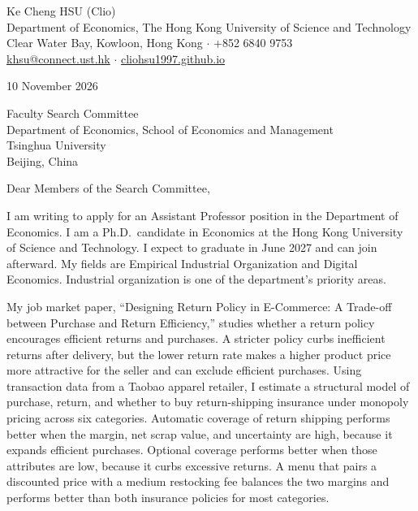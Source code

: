\documentclass[11pt]{article}
\begin{document}
\begin{flushleft}
Ke Cheng HSU (Clio) \\
Department of Economics, The Hong Kong University of Science and Technology \\
Clear Water Bay, Kowloon, Hong Kong $\cdot$ +852 6840 9753 \\
\href{mailto:khsu@connect.ust.hk}{khsu@connect.ust.hk} $\cdot$ \href{https://cliohsu1997.github.io/}{cliohsu1997.github.io}
\end{flushleft}

10 November 2026

\vspace{0.12em}
Faculty Search Committee \\
Department of Economics, School of Economics and Management \\
Tsinghua University \\
Beijing, China

\vspace{0.12em}
Dear Members of the Search Committee,

I am writing to apply for an Assistant Professor position in the Department of Economics. I am a Ph.D.\ candidate in Economics at the Hong Kong University of Science and Technology. I expect to graduate in June 2027 and can join afterward. My fields are Empirical Industrial Organization and Digital Economics. Industrial organization is one of the department's priority areas.

My job market paper, ``Designing Return Policy in E-Commerce: A Trade-off between Purchase and Return Efficiency,'' studies whether a return policy encourages efficient returns and purchases. A stricter policy curbs inefficient returns after delivery, but the lower return rate makes a higher product price more attractive for the seller and can exclude efficient purchases. Using transaction data from a Taobao apparel retailer, I estimate a structural model of purchase, return, and whether to buy return-shipping insurance under monopoly pricing across six categories. Automatic coverage of return shipping performs better when the margin, net scrap value, and uncertainty are high, because it expands efficient purchases. Optional coverage performs better when those attributes are low, because it curbs excessive returns. A menu that pairs a discounted price with a medium restocking fee balances the two margins and performs better than both insurance policies for most categories.
\end{document}
